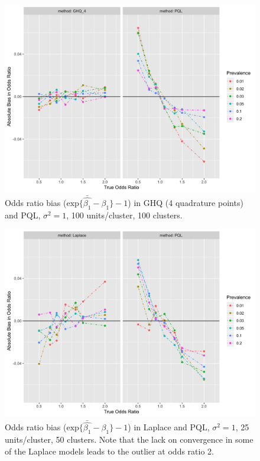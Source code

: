 \documentclass[Afour,times,sagev,doublespace]{sagej}
\begin{document}
\begin{figure}
\centering
\includegraphics[width=\linewidth]{_bias_pql_ghq4.png}
  \caption{Odds ratio bias ($\text{exp} \{ \bar{\hat{\beta_1}} - \beta_1 \} - 1$) in GHQ (4 quadrature points) and PQL, $\sigma^2=1$, 100 units/cluster, 100 clusters.}
  \label{fig:_bias_pql_ghq4}
\end{figure}

\begin{figure}
\centering
\includegraphics[width=\linewidth]{_bias_pql_lap.png}
  \caption{Odds ratio bias ($\text{exp} \{ \bar{\hat{\beta_1}} - \beta_1 \} - 1$) in Laplace and PQL, $\sigma^2=1$, 25 units/cluster, 50 clusters. Note that the lack on convergence in some of the Laplace models leads to the outlier at odds ratio 2.}
  \label{fig:_bias_pql_lap}
\end{figure}
\end{document}
